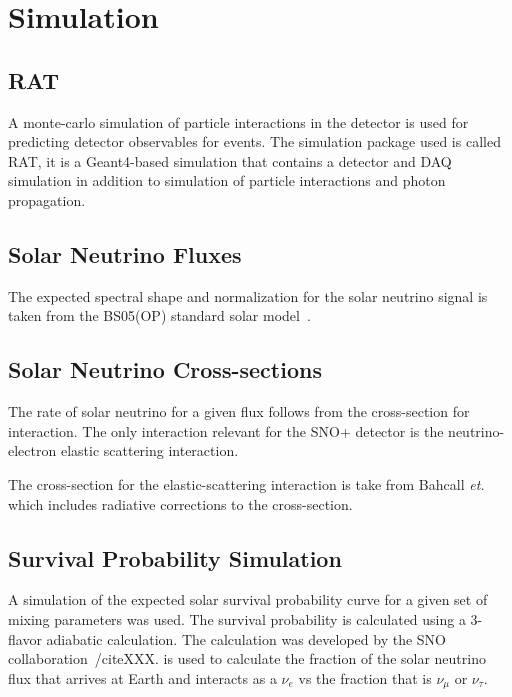 \section{Simulation}


\subsection{RAT}
A monte-carlo simulation of particle interactions in the detector is used
for predicting detector observables for events.
The simulation package used is called RAT, it is a Geant4-based simulation that
contains a detector and DAQ simulation in addition to simulation of particle
interactions and photon propagation.


\subsection{Solar Neutrino Fluxes}
The expected spectral shape and normalization for the solar neutrino signal is
taken from the BS05(OP) standard solar model~\cite{XXX}.

\subsection{Solar Neutrino Cross-sections}
The rate of solar neutrino for a given flux follows from the cross-section for
interaction. The only interaction relevant for the SNO+ detector is the
neutrino-electron elastic scattering interaction.

The cross-section for the elastic-scattering interaction is take from Bahcall
\textit{et.\al}~\cite{escrosssec} which includes radiative corrections to
the cross-section.

\subsection{Survival Probability Simulation}
A simulation of the expected solar survival probability curve for a given
set of mixing parameters was used.
The survival probability is calculated using a
3-flavor adiabatic calculation. The calculation was developed by the
SNO collaboration~/cite{XXX}.
is used to calculate the fraction of the solar neutrino flux that arrives
at Earth and interacts as a $\nu_{e}$ vs the fraction that is $\nu_{\mu}$ or $\nu_{\tau}$.

